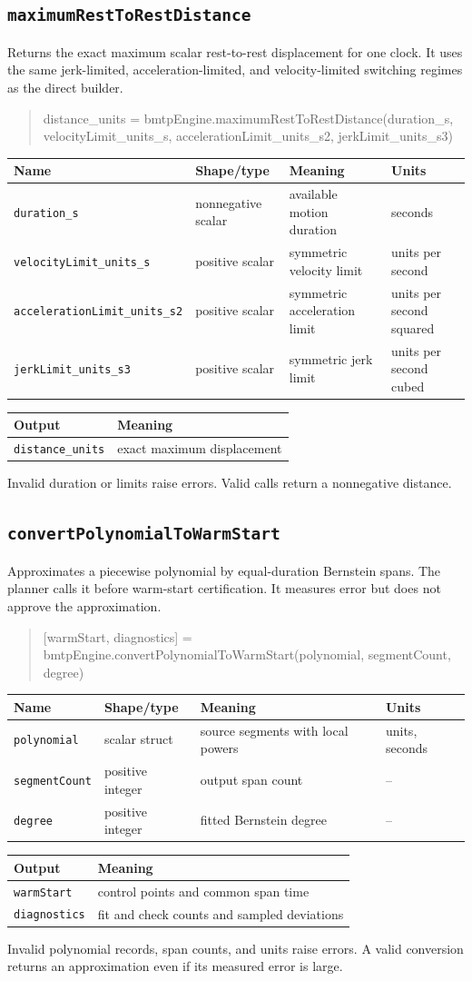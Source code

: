\documentclass[11pt]{article}
\makeatletter
\newcommand{\iface}[5]{#1\par\begin{quote}\small\ttfamily\raggedright #2\par\end{quote}
\begin{tabularx}{\textwidth}{@{}p{.24\textwidth}p{.21\textwidth}Xp{.12\textwidth}@{}}\toprule Name & Shape/type & Meaning & Units \\\midrule #3\\\bottomrule\end{tabularx}
\begin{tabularx}{\textwidth}{@{}p{.30\textwidth}X@{}}\toprule Output & Meaning \\\midrule #4\\\bottomrule\end{tabularx}
\begingroup\sloppy #5\par\endgroup\medskip}
\makeatother
\begin{document}
\subsection{\texttt{maximumRestToRestDistance}}
\iface{Returns the exact maximum scalar rest-to-rest displacement for one clock.
It uses the same jerk-limited, acceleration-limited, and velocity-limited
switching regimes as the direct builder.}
{distance\_units =\allowbreak{}
bmtpEngine.maximumRestToRestDistance(duration\_s,\allowbreak{}
velocityLimit\_units\_s,\allowbreak{} accelerationLimit\_units\_s2,\allowbreak{}
jerkLimit\_units\_s3)}
{\texttt{duration\_s} & nonnegative scalar & available motion duration & seconds \\
\texttt{velocityLimit\allowbreak\_units\_s} & positive scalar & symmetric velocity limit & units per second \\
\texttt{accelerationLimit\allowbreak\_units\_s2} & positive scalar & symmetric acceleration limit & units per second squared \\
\texttt{jerkLimit\_units\_s3} & positive scalar & symmetric jerk limit & units per second cubed}
{\texttt{distance\_units} & exact maximum displacement}
{Invalid duration or limits raise errors. Valid calls return a nonnegative
distance.}

\subsection{\texttt{convertPolynomialToWarmStart}}
\iface{Approximates a piecewise polynomial by equal-duration Bernstein spans.
The planner calls it before warm-start certification. It measures error but
does not approve the approximation.}
{[warmStart, diagnostics] =\allowbreak{}
bmtpEngine.convertPolynomialToWarmStart(polynomial,\allowbreak{}
segmentCount,\allowbreak{} degree)}
{\texttt{polynomial} & scalar struct & source segments with local powers & units, seconds \\
\texttt{segmentCount} & positive integer & output span count & -- \\
\texttt{degree} & positive integer & fitted Bernstein degree & --}
{\texttt{warmStart} & control points and common span time \\
\texttt{diagnostics} & fit and check counts and sampled deviations}
{Invalid polynomial records, span counts, and units raise errors. A valid
conversion returns an approximation even if its measured error is large.}
\end{document}
